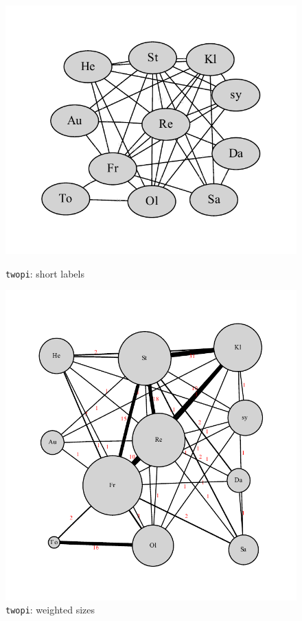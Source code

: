 \documentclass[a4paper]{scrartcl}
\newcommand{\code}[1]{\texttt{\color{code}#1}}
\begin{document}
\begin{figure}
\parbox[b]{0.5\textwidth}{\centering
  \includegraphics[width=\linewidth]{gv_ca-twopi-olf-short}
  \caption{\code{twopi}: short labels}
  \label{fig:gv-catwopi4}}%
\parbox[b]{0.5\textwidth}{\centering
  \includegraphics[width=\linewidth]{gv_ca-twopi-degwidth}\vspace{-1cm}
  \caption{\code{twopi}: weighted sizes}
  \label{fig:gv-catwopi5}}
\end{figure}
\end{document}

